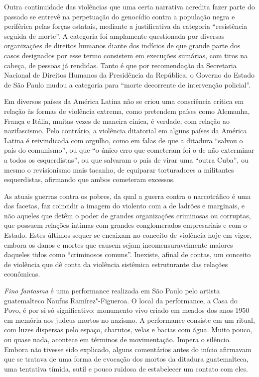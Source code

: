 Outra continuidade das violências que uma certa narrativa acredita fazer
parte do passado se entrevê na perpetuação do genocídio contra a
população negra e periférica pelas forças estatais, mediante a
justificativa da categoria ``resistência seguida de morte''. A categoria
foi amplamente questionada por diversas organizações de direitos humanos
diante dos indícios de que grande parte dos casos designados por esse
termo consistem em execuções sumárias, com tiros na cabeça, de pessoas
já rendidas. Tanto é que por recomendação da Secretaria Nacional de
Direitos Humanos da Presidência da República, o Governo do Estado de São
Paulo mudou a categoria para ``morte decorrente de intervenção
policial''.

Em diversos países da América Latina não se criou uma consciência
crítica em relação às formas de violência extrema, como pretendem países
como Alemanha, França e Itália, muitas vezes de maneira cínica, é
verdade, com relação ao nazifascismo. Pelo contrário, a violência
ditatorial em alguns países da América Latina é reivindicada com
orgulho, como em falas de que a ditadura ``salvou o país do comunismo'',
ou que ``o único erro que cometeram foi o de não exterminar a todos os
esquerdistas'', ou que salvaram o país de virar uma ``outra Cuba'', ou
mesmo o revisionismo mais tacanho, de equiparar torturadores a
militantes esquerdistas, afirmando que ambos cometeram excessos.

As atuais guerras contra os pobres, da qual a guerra contra o
narcotráfico é uma das facetas, faz coincidir a imagem do violento com a
de ladrões e marginais, e não aqueles que detêm o poder de grandes
organizações criminosas ou corruptas, que possuem relações íntimas com
grandes conglomerados empresariais e com o Estado. Estes últimos sequer se
encaixam no conceito de violência hoje em vigor, embora os danos e
mortes que causem sejam incomensuravelmente maiores daqueles tidos como
``criminosos comuns''. Inexiste, afinal de contas, um conceito de
violência que dê conta da violência sistêmica estruturante das
relações econômicas.

\asterisc

\emph{Fino fantasma} é uma performance realizada em São Paulo pelo
artista guatemalteco Naufus Ramírez"-Figueroa. O local da performance, a
Casa do Povo, é por si só significativo: monumento vivo criado em meados
dos anos 1950 em memória aos judeus mortos no nazismo. A performance
consiste em um ritual, com luzes dispersas pelo espaço, charutos, velas
e bacias com água. Muito pouco, ou quase nada, acontece em términos de
movimentação. Impera o silêncio. Embora não tivesse sido explicado,
alguns comentários antes do início afirmavam que se tratava de uma forma
de evocação dos mortos da ditadura guatemalteca, uma tentativa tímida,
sutil e pouco ruidosa de estabelecer um contato com eles.

